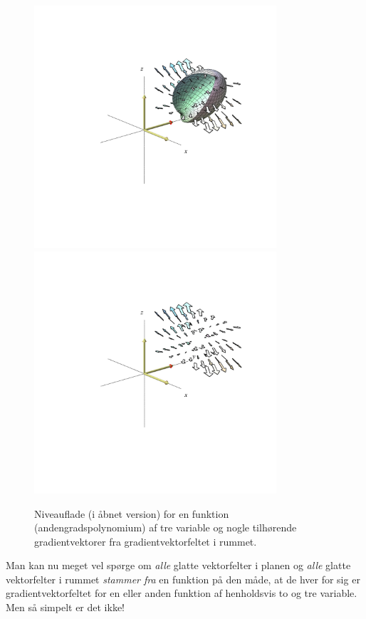 \begin{figure}[ht]
\centerline{\includegraphics[height=90mm]{FIGS/plotGradFeltEllip2}\includegraphics[height=90mm]{FIGS/plotGradFeltEllip1}}
\begin{center}
\caption{\small{Niveauflade (i åbnet version) for en funktion (andengradspolynomium) af tre variable og nogle tilhørende gradientvektorer fra gradientvektorfeltet i rummet.}}
\label{figGradFelt3D}
\end{center}
\end{figure}



\begin{aha}
Man kan nu meget vel spørge om \emph{alle} glatte vektorfelter i planen og \emph{alle} glatte vektorfelter i rummet
\emph{stammer fra} en funktion på den måde, at de hver for sig er gradientvektorfeltet for en eller anden funktion af henholdsvis to og tre variable. Men så simpelt er det ikke!
\end{aha}


